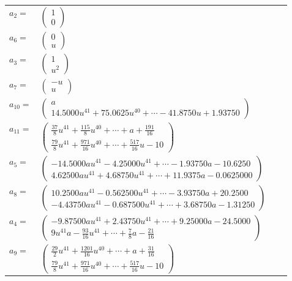 \documentclass[1p]{elsarticle_modified}
\theoremstyle{definition}
\begin{document}
\begin{tabular}{m{7pt} m{180pt} m{7pt} m{180pt} }
\flushright $a_{2}=$&$\begin{pmatrix}1\\0\end{pmatrix}$ \\
\flushright $a_{6}=$&$\begin{pmatrix}0\\u\end{pmatrix}$ \\
\flushright $a_{3}=$&$\begin{pmatrix}1\\u^2\end{pmatrix}$ \\
\flushright $a_{7}=$&$\begin{pmatrix}- u\\u\end{pmatrix}$ \\
\flushright $a_{10}=$&$\begin{pmatrix}a\\14.5000 u^{41}+75.0625 u^{40}+\cdots-41.8750 u+1.93750\end{pmatrix}$ \\
\flushright $a_{11}=$&$\begin{pmatrix}\frac{37}{8} u^{41}+\frac{115}{8} u^{40}+\cdots+a+\frac{191}{16}\\\frac{79}{8} u^{41}+\frac{971}{16} u^{40}+\cdots+\frac{517}{16} u-10\end{pmatrix}$ \\
\flushright $a_{5}=$&$\begin{pmatrix}-14.5000 a u^{41}-4.25000 u^{41}+\cdots-1.93750 a-10.6250\\4.62500 a u^{41}+4.68750 u^{41}+\cdots+11.9375 a-0.0625000\end{pmatrix}$ \\
\flushright $a_{8}=$&$\begin{pmatrix}10.2500 a u^{41}-0.562500 u^{41}+\cdots-3.93750 a+20.2500\\-4.43750 a u^{41}-0.687500 u^{41}+\cdots+3.68750 a-1.31250\end{pmatrix}$ \\
\flushright $a_{4}=$&$\begin{pmatrix}-9.87500 a u^{41}+2.43750 u^{41}+\cdots+9.25000 a-24.5000\\9 u^{41} a-\frac{93}{16} u^{41}+\cdots+\frac{7}{8} a-\frac{21}{16}\end{pmatrix}$ \\
\flushright $a_{9}=$&$\begin{pmatrix}\frac{29}{2} u^{41}+\frac{1201}{16} u^{40}+\cdots+a+\frac{31}{16}\\\frac{79}{8} u^{41}+\frac{971}{16} u^{40}+\cdots+\frac{517}{16} u-10\end{pmatrix}$ \\

\end{tabular}
\end{document}
